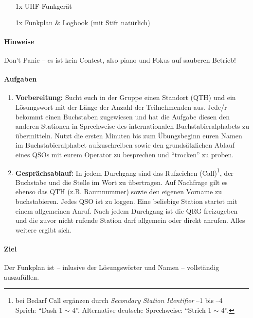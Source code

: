 \begin{itemize}
  \item[1x] UHF-Funkgerät
  \item[1x] Funkplan \& Logbook (mit Stift natürlich) %
\end{itemize}

\paragraph{Hinweise}

Don't Panic -- es ist kein Contest, also piano und Fokus auf sauberen Betrieb!


\paragraph{Aufgaben}

\begin{enumerate}
  \item \textbf{Vorbereitung:} Sucht euch in der Gruppe einen Standort (QTH) und ein
    Lösungswort mit der Länge der Anzahl der Teilnehmenden aus. Jede/r bekommt einen
    Buchstaben zugewiesen und hat die Aufgabe diesen den anderen Stationen in
    Sprechweise des internationalen Buchstabieralphabets zu übermitteln. Nutzt die
    ersten Minuten bis zum Übungsbeginn euren Namen im Buchstabieralphabet
    aufzuschreiben sowie den grundsätzlichen Ablauf eines QSOs mit eurem Operator zu
    besprechen und "`trocken"' zu proben.
  \item \textbf{Gesprächsablauf:} In jedem Durchgang sind das Rufzeichen
    (Call)\footnote{bei Bedarf Call ergänzen durch \emph{Secondary Station
    Identifier} --1 bis --4 \\ Sprich: ``Dash 1 $\sim$ 4''. Alternative deutsche
    Sprechweise: ``Strich 1 $\sim$ 4''.}, der Buchstabe und die Stelle im Wort
    zu übertragen. Auf Nachfrage gilt es ebenso das QTH (z.B.  Raumnummer) sowie
    den eigenen Vorname zu buchstabieren.  Jedes QSO ist zu loggen.  Eine
    beliebige Station startet mit einem allgemeinen Anruf. Nach jedem Durchgang
    ist die QRG freizugeben und die zuvor nicht rufende Station darf allgemein
    oder direkt anrufen. Alles weitere ergibt sich.
\end{enumerate}

\paragraph{Ziel} Der Funkplan ist -- inlusive der Lösungswörter und Namen --
vollständig auszufüllen.
